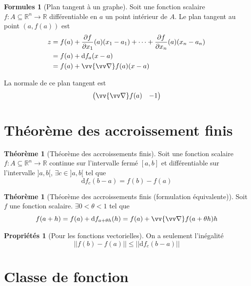 \documentclass[11pt,a4paper]{article}
\theoremstyle{definition}
\newtheorem{myprop}[mydef]{Propriétés}
\newtheorem{myform}[mydef]{Formules}
\newtheorem{mytheo}[mydef]{Théorème}
\newcommand{\R}{\mathbb{R}}
\newcommand{\dif}{\mathrm{d}}
\let\oldnabla\nabla
\renewcommand{\nabla}{\vv{\oldnabla}}
\newcommand{\fl}{\rightarrow}
\newcommand{\pa}{\partial}
\begin{document}
\begin{myform}[Plan tangent à un graphe]
Soit une fonction scalaire $f : A \subseteq \R^n \fl \R$ différentiable en $a$ un point intérieur de $A$. Le plan tangent au point $(a,f(a))$ est
\begin{align*} z & = f(a) + \frac{\pa f}{\pa x_1}(a)(x_1 - a_1) + \cdots + \frac{\pa f}{\pa x_n}(a) (x_n - a_n) \\
                   & = f(a) + \dif f_a(x-a) \\
                   & = f(a) + \nabla f(a)(x-a) \end{align*}

La normale de ce plan tangent est
\[ \begin{pmatrix} \nabla f(a) & -1 \end{pmatrix} \]
\end{myform}


\section{Théorème des accroissement finis}

\begin{mytheo}[Théorème des accroissements finis] Soit une fonction scalaire $f : A \subseteq \R^n \fl \R$ continue sur l'intervalle fermé $[a,b]$ et différentiable sur l'intervalle $]a,b[$, $\exists c \in ]a,b[$ tel que
\[ \dif f_c(b-a) = f(b) - f(a) \]
\end{mytheo}

\begin{mytheo}[Théorème des accroissements finis (formulation équivalente)] Soit $f$ une fonction scalaire. $\exists 0 < \theta < 1$ tel que
\[ f(a+h) = f(a) + \dif f_{a + \theta h}(h) = f(a) + \nabla f(a + \theta h)h \]
\end{mytheo}

\begin{myprop}[Pour les fonctions vectorielles] On a seulement l'inégalité
\[ || f(b) - f(a) || \leq || \dif f_c(b-a) || \]
\end{myprop}


\section{Classe de fonction}
\end{document}
